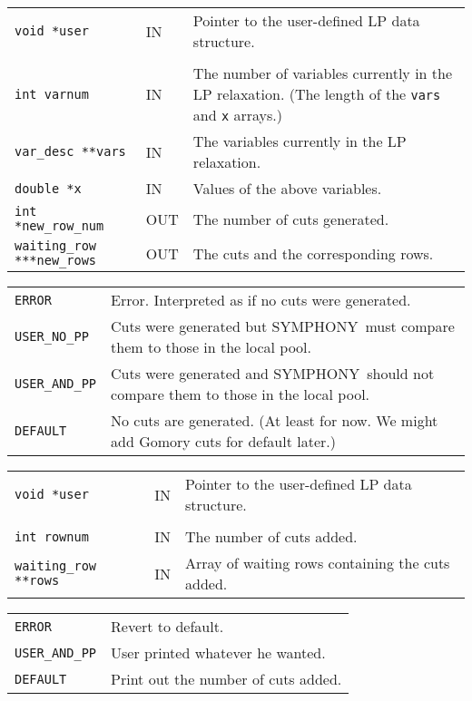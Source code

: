 \documentclass[twoside,11pt]{article}
\begin{document}
{\newpage
\clearpage
\samepage \begin{tabular}{llp{225pt}}
{\tt void *user} &  IN & Pointer to the user-defined LP data structure. \\ 
& & \\ 
{\tt int varnum} & IN & The number of variables currently in the LP
relaxation. (The length of the {\tt *vars} and {\tt x} arrays.) \\ 
{\tt var\_desc **vars} & IN & The variables currently in the LP relaxation.\\ 
{\tt double *x} & IN & Values of the above variables.\\ 
{\tt int *new\_row\_num} & OUT & The number of cuts generated. \\ 
{\tt waiting\_row ***new\_rows} & OUT & The cuts and the corresponding rows. \\ 
\end{tabular}
}

{\newpage
\clearpage
\samepage \begin{tabular}{lp{330pt}}
{\tt ERROR} & Error. Interpreted as if no cuts were generated. \\ 
{\tt USER\_NO\_PP} & Cuts were generated but {\sc SYMPHONY}\ must compare them to those
in the local pool. \\ 
{\tt USER\_AND\_PP} & Cuts were generated and {\sc SYMPHONY}\ should not compare them to
those in the local pool. \\ 
{\tt DEFAULT} & No cuts are generated. (At least for now. We might add Gomory
cuts for default later.) \\ 
\end{tabular}
}

{\newpage
\clearpage
\samepage \begin{tabular}{llp{265pt}}
{\tt void *user} &  IN & Pointer to the user-defined LP data structure. \\ 
& & \\ 
{\tt int rownum} & IN & The number of cuts added. \\ 
{\tt waiting\_row **rows} & IN & Array of waiting rows containing the
cuts added. \\ 
\end{tabular}
}

{\newpage
\clearpage
\samepage \begin{tabular}{lp{300pt}}
{\tt ERROR} & Revert to default. \\ 
{\tt USER\_AND\_PP} & User printed whatever he wanted. \\ 
{\tt DEFAULT} & Print out the number of cuts added. \\ 
\end{tabular}
}
\end{document}
